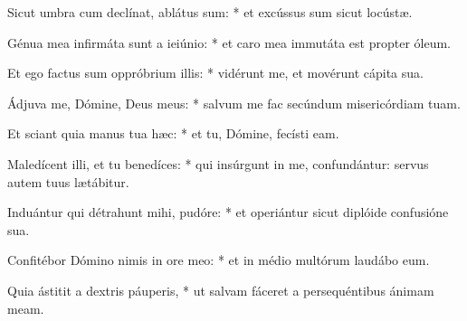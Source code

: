 \begin{psalmus}
Sicut umbra cum declínat, ablátus sum: * et excússus sum sicut locústæ.

Génua mea infirmáta sunt a ieiúnio: * et caro mea immutáta est propter óleum.

Et ego factus sum oppróbrium illis: * vidérunt me, et movérunt cápita sua.

Ádjuva me, Dómine, Deus meus: * salvum me fac secúndum misericórdiam tuam.

Et sciant quia manus tua hæc: * et tu, Dómine, fecísti eam.

Maledícent illi, et tu benedíces: * qui insúrgunt in me, confundántur: servus autem tuus lætábitur.

Induántur qui détrahunt mihi, pudóre: * et operiántur sicut diplóide confusióne sua.

Confitébor Dómino nimis in ore meo: * et in médio multórum laudábo eum.

Quia ástitit a dextris páuperis, * ut salvam fáceret a persequéntibus ánimam meam.

\end{psalmus}
